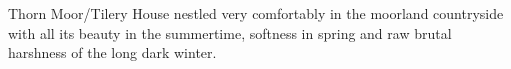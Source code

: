 Thorn Moor/Tilery House nestled very comfortably in the moorland countryside with all its beauty in the summertime, softness in spring and raw brutal harshness of the long dark winter.